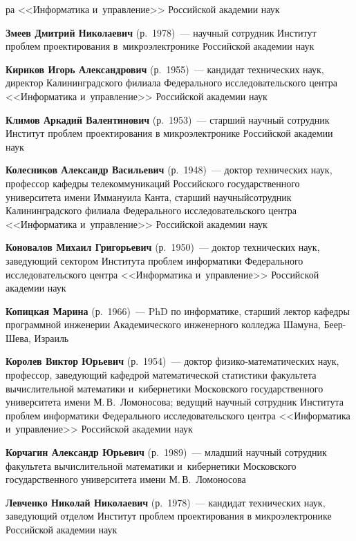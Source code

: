 \begin{multicols}{2}
\columnbreak

\noindent
ра <<Информатика и~управление>> 
Российской академии наук 



\noindent
\textbf{Змеев Дмитрий Николаевич} (р.\ 1978)~---
 научный сотрудник Институт проб\-лем проектирования 
 в~мик\-ро\-электронике Российской академии наук
 
 \noindent
\textbf{Кириков Игорь Александрович} (р.\ 1955)~--- 
кандидат технических наук, директор Калининградского филиала 
Федерального исследовательского центра <<Информатика и~управ\-ле\-ние>> 
Российской академии наук

\noindent
\textbf{Климов Аркадий Валентинович} (р.\ 1953)~---
 старший научный сотрудник Институт проб\-лем проектирования в микроэлектронике Российской академии наук

\noindent
\textbf{Колесников Александр Васильевич} (р.\ 1948)~---
доктор технических наук, профессор кафедры телекоммуникаций 
Российского государственного университета имени Иммануила Канта, 
старший научный\linebreak сотрудник Калининградского филиала Федерального 
исследовательского центра <<Информатика и~управ\-ле\-ние>> Российской академии наук

\noindent
\textbf{Коновалов Михаил Григорьевич} (р.\ 1950)~--- 
доктор технических наук, заведующий сектором Института 
проб\-лем информатики Федерального 
исследовательского центра <<Информатика и~управ\-ле\-ние>> Российской академии наук 

\noindent
\textbf{Копицкая Марина} (р.\ 1966)~---
PhD по информатике,  старший лектор кафедры программной инженерии 
Академического инженерного колледжа Шамуна, Беер-Шева, Израиль 

\noindent
\textbf{Королев Виктор Юрьевич} (р.\ 1954)~---
доктор фи\-зи\-ко-ма\-те\-ма\-ти\-че\-ских наук, профессор,
заведующий кафедрой 
математической статистики факультета вычислительной математики и~кибернетики Московского
государственного университета 
имени М.\,В.~Ломоносова;
ведущий научный сотрудник Института проб\-лем информатики Федерального 
исследовательского центра <<Информатика и~управ\-ле\-ние>> Российской академии наук

\noindent
\textbf{Корчагин Александр Юрьевич} (р.\ 1989)~---
младший научный сотрудник факультета вычислительной математики и~кибернетики 
Московского государствен\-но\-го университета имени М.\,В.~Ломоносова



\noindent
\textbf{Левченко Николай Николаевич} (р.\ 1978)~--- 
кандидат технических наук, заведующий отделом Институт проб\-лем проектирования 
в микроэлектронике Российской академии наук


\end{multicols}
